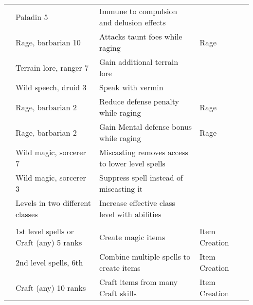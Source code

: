 \begin{longtabuwrapper}
\begin{longtabu}{>{\lcol}p{10em} >{\lcol}p{15em} >{\lcol}X >{\lcol}p{8em} >{\lcol}p{3em}}
             & Paladin 5                         & Immune to compulsion and delusion effects & \x &  \\
                 & Rage, barbarian 10                & Attacks taunt foes while raging & Rage &  \\
         & Terrain lore, ranger 7 & Gain additional terrain lore & \x &  \\
                 & Wild speech, druid 3              & Speak with vermin & \x &  \\
                     & Rage, barbarian 2                 & Reduce defense penalty while raging & Rage &  \\
                  & Rage, barbarian 2                 & Gain Mental defense bonus while raging & Rage &  \\
             & Wild magic, sorcerer 7            & Miscasting removes access to lower level spells & \x &  \\
             & Wild magic, sorcerer 3            & Suppress spell instead of miscasting it & \x &  \\
                   & Levels in two different classes   & Increase effective class level with abilities & \x &  \\

        \midrule
         &  &  &  &  \\
         & 1st level spells or Craft (any) 5 ranks & Create magic items & Item Creation &  \\
         & 2nd level spells, 6th & Combine multiple spells to create items & Item Creation &  \\
         & Craft (any) 10 ranks & Craft items from many Craft skills & Item Creation &  \\


\end{longtabu}
\end{longtabuwrapper}
